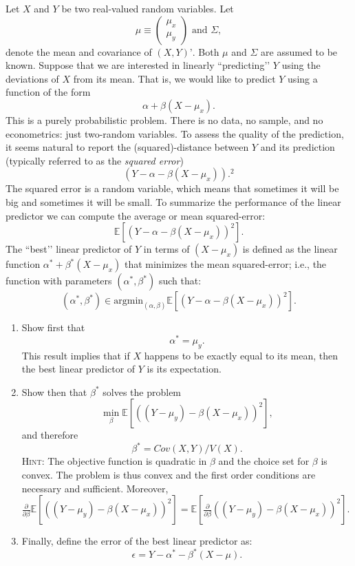 \documentclass[11pt]{article} %
\begin{document}
\begin{prproblem}
Let $X$ and $Y$ be two real-valued random variables. Let
\[\mu \equiv \begin{pmatrix} \mu_x \\ \mu_y \end{pmatrix} \textrm{ and } \Sigma, \]
denote the mean and covariance of $(X,Y)’$. Both $\mu$ and $\Sigma$ are assumed to be known. Suppose that we are interested in linearly ``predicting’’ $Y$ using the deviations of $X$ from its mean. That is, we would like to predict $Y$ using a function of the form
\[ \alpha + \beta (X-\mu_x). \]
This is a purely probabilistic problem. There is no data, no sample, and no econometrics: just two-random variables. To assess the quality of the prediction, it seems natural to report the (squared)-distance between $Y$ and its prediction (typically referred to as the \emph{squared error})
\[ (Y - \alpha -\beta (X-\mu_x)).^2 \]
The squared error is a random variable, which means that sometimes it will be big and sometimes it will be small. To summarize the performance of the linear predictor we can compute the average or mean squared-error:
\[ \mathbb{E}[(Y - \alpha -\beta (X-\mu_x))^2]. \]   
The ``best’’ linear predictor of $Y$ in terms of $(X-\mu_x)$ is defined as the linear function $\alpha^* + \beta^* (X-\mu_x)$ that minimizes the mean squared-error; i.e., the function with parameters $(\alpha^*,\beta^*)$ such that:
\[ (\alpha^*,\beta^*) \in \textrm{argmin}_{(\alpha,\beta)} \mathbb{E}[(Y-\alpha-\beta (X-\mu_x))^2].  \]
\begin{enumerate}
\item Show first that 
\[ \alpha^* = \mu_y. \]
This result implies that if $X$ happens to be exactly equal to its mean, then the best linear predictor of $Y$ is its expectation. 
\item Show then that $\beta^*$ solves the problem
\[ \min_{\beta} \mathbb{E}[ ((Y-\mu_y) - \beta (X-\mu_x))^2 ], \]
and therefore 
\[ \beta^*  = Cov(X,Y) / V(X). \]
{\scshape Hint:} The objective function is quadratic in $\beta$ and the choice set for $\beta$ is convex. The problem is thus convex and the first order conditions are necessary and sufficient. Moreover, $\frac{\partial}{\partial \beta}\mathbb{E}[ ((Y-\mu_y) - \beta (X-\mu_x))^2 ] = \mathbb{E}[  \frac{\partial}{\partial \beta}((Y-\mu_y) - \beta (X-\mu_x))^2 ]$.

\item Finally, define the error of the best linear predictor as:
\[ \epsilon = Y - \alpha^* - \beta^*(X-\mu).\]


\end{enumerate}
\end{prproblem}
\end{document}
